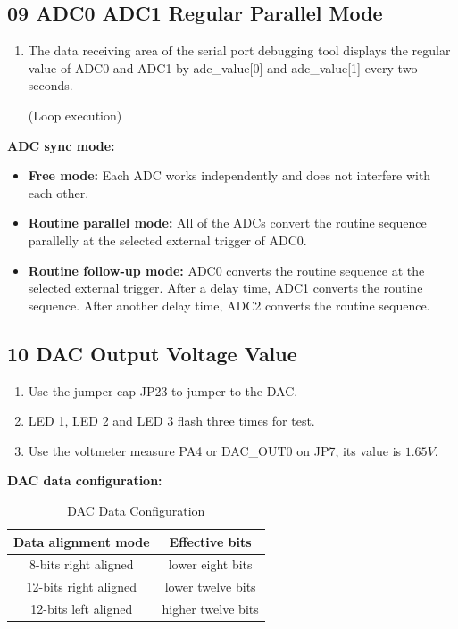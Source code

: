 \documentclass[12pt,a4paper]{ctexart}
\begin{document}
\subsection{09 ADC0 ADC1 Regular Parallel Mode}

\begin{enumerate}
    \item The data receiving area of the serial port debugging tool displays the regular value of ADC0 and ADC1 by adc\_value[0] and adc\_value[1] every two seconds.
          
          (Loop execution)
\end{enumerate}

\textbf{ADC sync mode:}
\begin{itemize}
    \item \textbf{Free mode:} Each ADC works independently and does not interfere with each other.
    \item \textbf{Routine parallel mode:} All of the ADCs convert the routine sequence parallelly at the selected external trigger of ADC0.
    \item \textbf{Routine follow-up mode:} ADC0 converts the routine sequence at the selected external trigger. After a delay time, ADC1 converts the routine sequence. After another delay time, ADC2 converts the routine sequence.
\end{itemize}

\subsection{10 DAC Output Voltage Value}

\begin{enumerate}
    \item Use the jumper cap JP23 to jumper to the DAC.
    \item LED 1, LED 2 and LED 3 flash three times for test.
    \item Use the voltmeter measure PA4 or DAC\_OUT0 on JP7, its value is $1.65V$.
\end{enumerate}

\textbf{DAC data configuration:}
\begin{table}[htbp]
    \centering
    \caption{DAC Data Configuration}
    \begin{tabular}{|c|c|}
        \hline
        Data alignment mode   & Effective bits     \\
        \hline
        8-bits right aligned  & lower eight bits   \\
        \hline
        12-bits right aligned & lower twelve bits  \\
        \hline
        12-bits left aligned  & higher twelve bits \\
        \hline
    \end{tabular}
\end{table}
\end{document}
